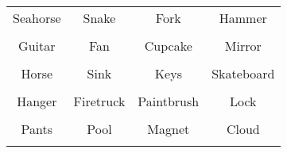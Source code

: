 \documentclass[12pt,a4paper]{article}
\begin{document}
\thispagestyle{empty}
\begin{table}[]
\centering
\Huge
\begin{tabular}{cccc}
 Seahorse& Snake& Fork& Hammer\\  & & & \\
 Guitar& Fan& Cupcake& Mirror\\  & & & \\
 Horse& Sink& Keys& Skateboard\\  & & & \\
 Hanger& Firetruck& Paintbrush& Lock\\  & & & \\
 Pants& Pool& Magnet& Cloud\\  & & & \\
\end{tabular}
\end{table}
\end{document}
